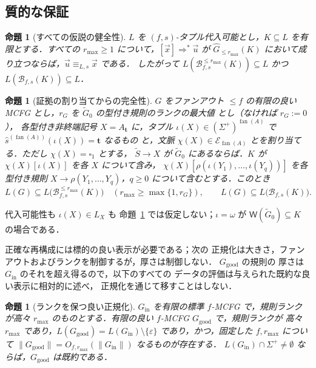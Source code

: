 \documentclass[11pt,a4paper]{ltjsarticle}
\numberwithin{equation}{section}
\theoremstyle{plain}
\newtheorem{proposition}[theorem]{命題}
\theoremstyle{definition}
\theoremstyle{remark}
\newcommand{\Wit}{\mathsf{W}}
\newcommand{\tuple}[1]{\vec{#1}}
\newcommand{\blank}{\square}
\newcommand{\eps}{\varepsilon}
\newcommand{\fan}{\operatorname{fan}}
\theoremstyle{plain}
\begin{document}
\subsection{質的な保証}
\label{sec:completeness}
\label{sec:poly-time}

\begin{proposition}[すべての仮説の健全性]
\label{prop:reconstruction-soundness}
$L$ を $(f,s)$-タプル代入可能とし，$K\subseteq L$ を有限とする．すべての
$r_{\max}\ge1$ について，$[\tuple x]\Rightarrow^*\tuple u$ が
$\widehat G_{\le r_{\max}}(K)$ において成り立つならば，$\tuple u\equiv_{L,s}\tuple x$ である．
したがって $L(\mathcal B_{f,s}^{\le r_{\max}}(K))\subseteq L$ かつ
$L(\mathcal B_{f,s}(K))\subseteq L$．
\end{proposition}

\begin{proposition}[証拠の割り当てからの完全性]
\label{prop:completeness}
$G$ をファンアウト $\le f$ の有限の良い MCFG とし，$r_G$ を $\widetilde G_0$ の型付き規則のランクの最大値
とし（なければ $r_G:=0$），
各型付き非終端記号 $X=A_{\mathbf t}$ に，タプル
$\iota(X)\in(\Sigma^+)^{\fan(A)}$ で $\widehat s^{(\fan(A))}(\iota(X))=\mathbf t$ なるもの
と，文脈 $\chi(X)\in\mathcal E_{\fan(A)}$ とを割り当てる．ただし $\chi(X)=\blank_1$ とする，
$\widetilde S\to X$ が $\widetilde G_0$ にあるならば．$K$ が
$\chi(X)[\iota(X)]$ を各 $X$ について含み，
$\chi(X)[\rho(\iota(Y_1),\ldots,\iota(Y_q))]$ を各
型付き規則 $X\to\rho(Y_1,\ldots,Y_q)$，$q\ge0$ について含むとする．このとき
\[
 L(G)\subseteq L\bigl(\mathcal B_{f,s}^{\le r_{\max}}(K)\bigr)
 \quad(r_{\max}\ge\max\{1,r_G\}),\qquad
 L(G)\subseteq L\bigl(\mathcal B_{f,s}(K)\bigr).
\]
\end{proposition}

代入可能性も $\iota(X)\in L_X$ も
命題~\ref{prop:completeness} では仮定しない；$\iota=\omega$ が
$\Wit(\widetilde G_0)\subseteq K$ の場合である．

正確な再構成には標的の良い表示が必要である；次の
正規化は大きさ，ファンアウトおよびランクを制御するが，厚さは制御しない．
$G_{\mathrm{good}}$ の規則の
厚さは $G_{\mathrm{in}}$ のそれを超え得るので，以下のすべての
データの評価は与えられた既約な良い表示に相対的に述べ，
正規化を通じて移すことはしない．

\begin{proposition}[ランクを保つ良い正規化]
\label{prop:good-normalization}
$G_{\mathrm{in}}$ を有限の標準 $f$-MCFG で，規則ランクが高々
$r_{\max}$ のものとする．有限の良い $f$-MCFG $G_{\mathrm{good}}$ で，規則ランクが
高々 $r_{\max}$ であり，$L(G_{\mathrm{good}})=L(G_{\mathrm{in}})\setminus\{\eps\}$
であり，かつ，固定した $f,r_{\max}$ について
$\|G_{\mathrm{good}}\|=O_{f,r_{\max}}(\|G_{\mathrm{in}}\|)$ なるものが存在する．
$L(G_{\mathrm{in}})\cap\Sigma^+\ne\emptyset$ ならば，$G_{\mathrm{good}}$ は既約である．
\end{proposition}
\end{document}
